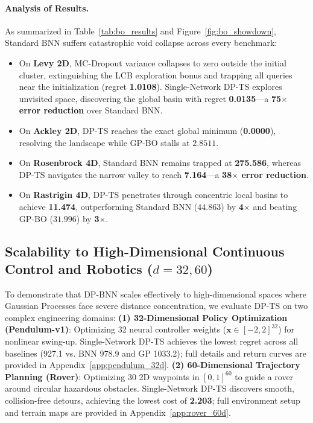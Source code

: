 \documentclass{article}
\begin{document}
\paragraph{Analysis of Results.} As summarized in Table~\ref{tab:bo_results} and Figure~\ref{fig:bo_showdown}, Standard BNN suffers catastrophic void collapse across every benchmark:
\begin{itemize}
    \item On \textbf{Levy 2D}, MC-Dropout variance collapses to zero outside the initial cluster, extinguishing the LCB exploration bonus and trapping all queries near the initialization (regret \textbf{1.0108}). Single-Network DP-TS explores unvisited space, discovering the global basin with regret \textbf{0.0135}---a \textbf{75$\times$ error reduction} over Standard BNN.
    \item On \textbf{Ackley 2D}, DP-TS reaches the exact global minimum (\textbf{0.0000}), resolving the landscape while GP-BO stalls at $2.8511$.
    \item On \textbf{Rosenbrock 4D}, Standard BNN remains trapped at \textbf{275.586}, whereas DP-TS navigates the narrow valley to reach \textbf{7.164}---a \textbf{38$\times$ error reduction}.
    \item On \textbf{Rastrigin 4D}, DP-TS penetrates through concentric local basins to achieve \textbf{11.474}, outperforming Standard BNN ($44.863$) by \textbf{4$\times$} and beating GP-BO ($31.996$) by \textbf{3$\times$}.
\end{itemize}

\subsection{Scalability to High-Dimensional Continuous Control and Robotics ($d=32, 60$)}
To demonstrate that DP-BNN scales effectively to high-dimensional spaces where Gaussian Processes face severe distance concentration, we evaluate DP-TS on two complex engineering domains:
\textbf{(1) 32-Dimensional Policy Optimization (Pendulum-v1)}: Optimizing 32 neural controller weights ($\mathbf{x} \in [-2, 2]^{32}$) for nonlinear swing-up. Single-Network DP-TS achieves the lowest regret across all baselines (927.1 vs. BNN 978.9 and GP 1033.2); full details and return curves are provided in Appendix~\ref{app:pendulum_32d}.
\textbf{(2) 60-Dimensional Trajectory Planning (Rover)}: Optimizing 30 2D waypoints in $[0, 1]^{60}$ to guide a rover around circular hazardous obstacles. Single-Network DP-TS discovers smooth, collision-free detours, achieving the lowest cost of \textbf{2.203}; full environment setup and terrain maps are provided in Appendix~\ref{app:rover_60d}.
\end{document}
